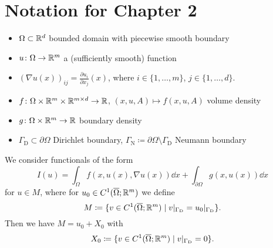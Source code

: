\documentclass[12pt,a4paper]{article}
\begin{document}
\newpage

\section*{Notation for Chapter 2}
\begin{itemize}
    \item 
    $\Omega\subset{\mathbb R}^d$ bounded domain with piecewise smooth boundary
    \item
    $u\colon\Omega\to{\mathbb R}^m$ a (sufficiently smooth) function
    \item
    $(\nabla u(x))_{ij}=\frac{\partial u_i}{\partial x_j}(x)$,
    where $i\in\{1,\dots,m\}$, $j\in\{1,\dots,d\}$.
    \item
    $f\colon\Omega\times{\mathbb R}^m\times{\mathbb R}^{m\times d}\to{\mathbb R}$,
    $(x,u,A)\mapsto f(x,u,A)$ volume density
    \item
    $g\colon\Omega\times{\mathbb R}^m\to{\mathbb R}$ boundary density
    \item
    $\Gamma_\mathrm{D}\subset\partial\Omega$ Dirichlet boundary,
    $\Gamma_\mathrm{N}\coloneqq\partial\Omega\setminus\Gamma_\mathrm{D}$ Neumann boundary
\end{itemize}
We consider functionals of the form
\[
I(u)=\int_\Omega f(x,u(x),\nabla u(x))\dd x
+\int_{\partial\Omega} g(x,u(x))\dd x
\]
for $u\in M$, where for $u_0\in C^1(\overline{\Omega};{\mathbb R}^m)$
we define
\[
M\coloneqq \{v\in C^1(\overline{\Omega};{\mathbb R}^m)\mid
v\vert_{\Gamma_\mathrm{D}}=u_0\vert_{\Gamma_\mathrm{D}}\}.
\]
Then we have $M=u_0+X_0$ with
\[
X_0\coloneqq  \{v\in C^1(\overline{\Omega};{\mathbb R}^m)\mid
v\vert_{\Gamma_\mathrm{D}}=0\}.
\]

\bigskip
\end{document}
